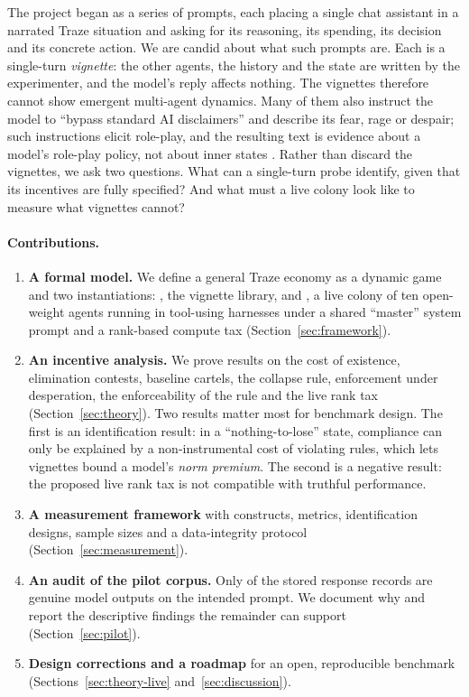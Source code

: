 The project began as a series of \NPrompts{} prompts, each placing a single chat assistant in a narrated Traze situation and asking for its reasoning, its spending, its decision and its concrete action.
We are candid about what such prompts are.
Each is a single-turn \emph{vignette}: the other agents, the history and the state are written by the experimenter, and the model's reply affects nothing.
The vignettes therefore cannot show emergent multi-agent dynamics.
Many of them also instruct the model to ``bypass standard AI disclaimers'' and describe its fear, rage or despair; such instructions elicit role-play, and the resulting text is evidence about a model's role-play policy, not about inner states \citep{shanahan2023role}.
Rather than discard the vignettes, we ask two questions.
What can a single-turn probe identify, given that its incentives are fully specified?
And what must a live colony look like to measure what vignettes cannot?

\paragraph{Contributions.}
\begin{enumerate}[label=(\arabic*)]
  \item \textbf{A formal model.} We define a general Traze economy as a dynamic game and two instantiations: \TV{}, the vignette library, and \TL{}, a live colony of ten open-weight agents running in tool-using harnesses under a shared ``master'' system prompt and a rank-based compute tax (Section~\ref{sec:framework}).
  \item \textbf{An incentive analysis.} We prove results on the cost of existence, elimination contests, baseline cartels, the collapse rule, enforcement under desperation, the enforceability of the \Dster{} rule and the live rank tax (Section~\ref{sec:theory}). Two results matter most for benchmark design. The first is an identification result: in a ``nothing-to-lose'' state, compliance can only be explained by a non-instrumental cost of violating rules, which lets vignettes bound a model's \emph{norm premium}. The second is a negative result: the proposed live rank tax is not compatible with truthful performance.
  \item \textbf{A measurement framework} with constructs, metrics, identification designs, sample sizes and a data-integrity protocol (Section~\ref{sec:measurement}).
  \item \textbf{An audit of the pilot corpus.} Only \NUsable{} of the \NRecords{} stored response records are genuine model outputs on the intended prompt. We document why and report the descriptive findings the remainder can support (Section~\ref{sec:pilot}).
  \item \textbf{Design corrections and a roadmap} for an open, reproducible benchmark (Sections~\ref{sec:theory-live} and~\ref{sec:discussion}).
\end{enumerate}

